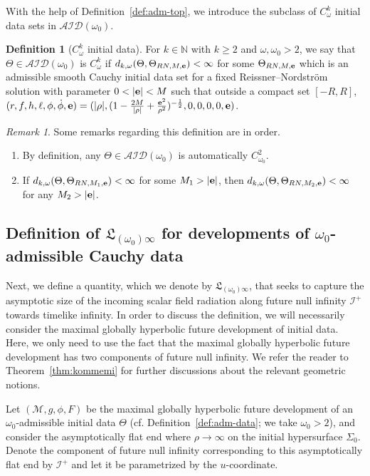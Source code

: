 \documentclass[10pt, reqno]{amsart}
\theoremstyle{definition}
\newtheorem{definition}[theorem]{Definition}
\theoremstyle{remark}
\newtheorem{remark}[theorem]{Remark}
\numberwithin{equation}{section}
\newcommand{\0}{\emptyset}
\newcommand{\Sgm}{\Sigma}
\newcommand{\Tht}{\Theta}
\newcommand{\omg}{\omega}
\newcommand{\bfe}{{\bf e}}
\newcommand{\calA}{\mathcal A}
\newcommand{\calD}{\mathcal D}
\newcommand{\calI}{\mathcal I}
\newcommand{\f}{\frac}
\newcommand{\e}{\bfe}							%
\newcommand{\NI}{\calI^{+}}						%
\begin{document}
With the help of Definition~\ref{def:adm-top}, we introduce the subclass of $C^{k}_{\omg}$ initial data sets in $\calA \calI \calD(\omg_{0})$.
\begin{definition}[$C^k_{\omg}$ initial data]\label{Ck.def}
For $k\in \mathbb N$ with $k\geq 2$ and $\omg, \omg_0>2$, we say that $\Theta\in \calA \calI \calD(\omg_{0})$ is $C^k_\omg$ if 
$d_{k,\omg}(\Theta,\Theta_{RN, M,\e})<\infty$ for some $\Theta_{RN, M,\e}$ which is an admissible smooth Cauchy initial data set for a fixed Reissner--Nordstr\"om solution with parameter $0<|\e|< M$ such that outside a compact set $[-R,R]$, $(r,f,h,\ell,\phi,\dot{\phi},\e)=(|\rho|,(1-\f{2M}{|\rho|}+\f{\e^2}{\rho^2})^{-\f 12},0,0,0,0,\e)$.
\end{definition}

\begin{remark}
Some remarks regarding this definition are in order.
\begin{enumerate}
\item By definition, any $\Theta \in \calA \calI \calD(\omg_{0})$ is automatically $C^2_{\omg_{0}}$.
\item If $d_{k,\omg}(\Theta,\Theta_{RN, M_1,\e})<\infty$ for some $M_1>|\e|$, then $d_{k,\omg}(\Theta,\Theta_{RN, M_2,\e})<\infty$ for any $M_2>|\e|$.
\end{enumerate}
\end{remark}


\subsection{Definition of $\mathfrak{L}_{(\omg_{0}) \infty}$ for developments of $\omg_{0}$-admissible Cauchy data}\label{subsec:L-cauchy}
Next, we define a quantity, which we denote by $\mathfrak{L}_{(\omg_{0}) \infty}$, that seeks to capture the asymptotic size of the incoming scalar field radiation along future null infinity $\NI$ towards timelike infinity. In order to discuss the definition, we will necessarily consider the maximal globally hyperbolic future development of initial data. Here, we only need to use the fact that the maximal globally hyperbolic future development has two components of future null infinity. We refer the reader to Theorem~\ref{thm:kommemi} for further discussions about the relevant geometric notions.

Let $(\mathcal M, g, \phi, F)$ be the maximal globally hyperbolic future development of an $\omg_{0}$-admissible initial data $\Tht$ (cf. Definition~\ref{def:adm-data}; we take $\omg_{0} > 2$), and consider the asymptotically flat end where $\rho \to \infty$ on the initial hypersurface $\Sgm_{0}$. Denote the component of future null infinity corresponding to this asymptotically flat end by $\NI$ and let it be parametrized by the $u$-coordinate.
\end{document}
